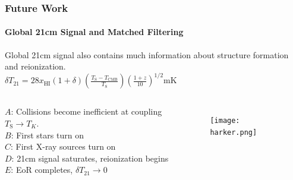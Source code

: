 \documentclass{beamer}
\begin{document}
\begin{frame}
\frametitle{Future Work}
\framesubtitle{Global 21cm Signal and Matched Filtering}
Global 21cm signal also contains much information about structure formation and reionization.\\
$\delta T_{21} = 28 x_{\text{HI}}(1+\delta) \left( \frac{T_{\text{S}} - T_{\text{CMB}}}{T_{\text{S}}} \right)\left( \frac{1+z}{10} \right)^{1/2}\text{mK}$
\begin{columns}[l]
\column{2.3in}
$A$: Collisions become inefficient at coupling $T_{\text{S}} \to T_{K}$.\\
$B$: First stars turn on\\
$C$: First X-ray sources turn on\\
$D$: 21cm signal saturates, reionization begins\\
$E$: EoR completes, $\delta T_{21}\to 0$\\
\column{1.8in}
\begin{figure}[h]
  \centering
  \texttt{[image: harker.png]}
  \caption{{\tiny \cite{Harker:2011et}}}
\end{figure}
\end{columns}
\end{frame}
\end{document}
